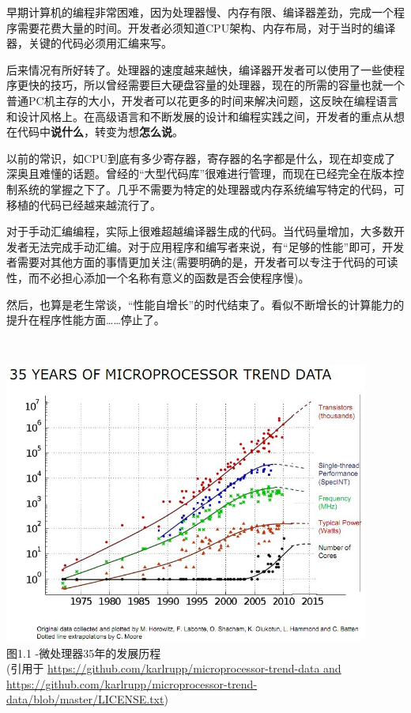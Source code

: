 
早期计算机的编程非常困难，因为处理器慢、内存有限、编译器差劲，完成一个程序需要花费大量的时间。开发者必须知道CPU架构、内存布局，对于当时的编译器，关键的代码必须用汇编来写。

后来情况有所好转了。处理器的速度越来越快，编译器开发者可以使用了一些使程序更快的技巧，所以曾经需要巨大硬盘容量的处理器，现在的所需的容量也就一个普通PC机主存的大小，开发者可以花更多的时间来解决问题，这反映在编程语言和设计风格上。在高级语言和不断发展的设计和编程实践之间，开发者的重点从想在代码中\textbf{说什么}，转变为想\textbf{怎么说}。

以前的常识，如CPU到底有多少寄存器，寄存器的名字都是什么，现在却变成了深奥且难懂的话题。曾经的“大型代码库”很难进行管理，而现在已经完全在版本控制系统的掌握之下了。几乎不需要为特定的处理器或内存系统编写特定的代码，可移植的代码已经越来越流行了。

对于手动汇编编程，实际上很难超越编译器生成的代码。当代码量增加，大多数开发者无法完成手动汇编。对于应用程序和编写者来说，有“足够的性能”即可，开发者需要对其他方面的事情更加关注(需要明确的是，开发者可以专注于代码的可读性，而不必担心添加一个名称有意义的函数是否会使程序慢)。

然后，也算是老生常谈，“性能自增长”的时代结束了。看似不断增长的计算能力的提升在程序性能方面……停止了。


\hspace*{\fill} \\ %
\begin{center}
\includegraphics[width=0.9\textwidth]{content/1/chapter1/images/1.jpg}\\
图1.1 -微处理器35年的发展历程 \\
(引用于 \url{https://github.com/karlrupp/microprocessor-trend-data and https://github.com/karlrupp/microprocessor-trend-data/blob/master/LICENSE.txt})
\end{center}

